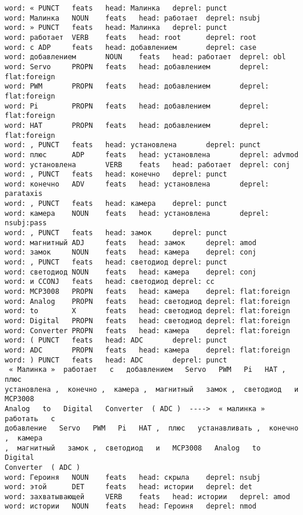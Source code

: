 \documentclass[11pt]{article}
\begin{document}
\begin{Verbatim}[commandchars=\\\{\}]
word: « PUNCT   feats   head: Малинка   deprel: punct
word: Малинка   NOUN    feats   head: работает  deprel: nsubj
word: » PUNCT   feats   head: Малинка   deprel: punct
word: работает  VERB    feats   head: root      deprel: root
word: с ADP     feats   head: добавлением       deprel: case
word: добавлением       NOUN    feats   head: работает  deprel: obl
word: Servo     PROPN   feats   head: добавлением       deprel: flat:foreign
word: PWM       PROPN   feats   head: добавлением       deprel: flat:foreign
word: Pi        PROPN   feats   head: добавлением       deprel: flat:foreign
word: HAT       PROPN   feats   head: добавлением       deprel: flat:foreign
word: , PUNCT   feats   head: установлена       deprel: punct
word: плюс      ADP     feats   head: установлена       deprel: advmod
word: установлена       VERB    feats   head: работает  deprel: conj
word: , PUNCT   feats   head: конечно   deprel: punct
word: конечно   ADV     feats   head: установлена       deprel: parataxis
word: , PUNCT   feats   head: камера    deprel: punct
word: камера    NOUN    feats   head: установлена       deprel: nsubj:pass
word: , PUNCT   feats   head: замок     deprel: punct
word: магнитный ADJ     feats   head: замок     deprel: amod
word: замок     NOUN    feats   head: камера    deprel: conj
word: , PUNCT   feats   head: светодиод deprel: punct
word: светодиод NOUN    feats   head: камера    deprel: conj
word: и CCONJ   feats   head: светодиод deprel: cc
word: MCP3008   PROPN   feats   head: камера    deprel: flat:foreign
word: Analog    PROPN   feats   head: светодиод deprel: flat:foreign
word: to        X       feats   head: светодиод deprel: flat:foreign
word: Digital   PROPN   feats   head: светодиод deprel: flat:foreign
word: Converter PROPN   feats   head: камера    deprel: flat:foreign
word: ( PUNCT   feats   head: ADC       deprel: punct
word: ADC       PROPN   feats   head: камера    deprel: flat:foreign
word: ) PUNCT   feats   head: ADC       deprel: punct
 « Малинка »  работает   с   добавлением   Servo   PWM   Pi   HAT ,  плюс
установлена ,  конечно ,  камера ,  магнитный   замок ,  светодиод   и   MCP3008
Analog   to   Digital   Converter  ( ADC )  ---->  « малинка »  работать   с
добавление   Servo   PWM   Pi   HAT ,  плюс   устанавливать ,  конечно ,  камера
,  магнитный   замок ,  светодиод   и   MCP3008   Analog   to   Digital
Converter  ( ADC )
word: Героиня   NOUN    feats   head: скрыла    deprel: nsubj
word: этой      DET     feats   head: истории   deprel: det
word: захватывающей     VERB    feats   head: истории   deprel: amod
word: истории   NOUN    feats   head: Героиня   deprel: nmod

\end{Verbatim}
\end{document}
